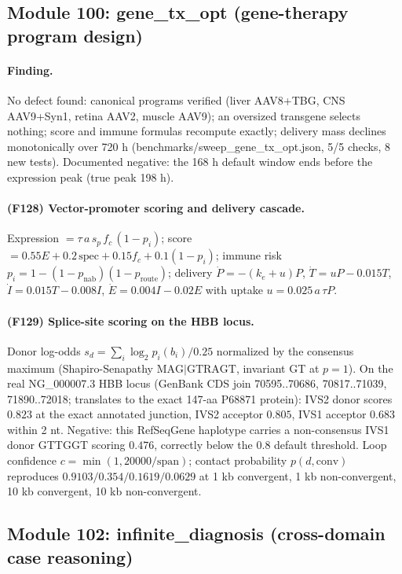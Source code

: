 \subsection{Module 100: gene\_tx\_opt (gene-therapy program design)}
\paragraph{Finding.} No defect found: canonical programs verified (liver AAV8+TBG, CNS AAV9+Syn1, retina AAV2, muscle AAV9); an oversized transgene selects nothing; score and immune formulas recompute exactly; delivery mass declines monotonically over 720 h (benchmarks/sweep\_gene\_tx\_opt.json, 5/5 checks, 8 new tests). Documented negative: the 168 h default window ends before the expression peak (true peak 198 h).
\paragraph{(F128) Vector-promoter scoring and delivery cascade.} Expression $=\tau\,a\,s_p\,f_c\,(1-p_i)$; score $=0.55E+0.2\,\mathrm{spec}+0.15f_c+0.1(1-p_i)$; immune risk $p_i=1-(1-p_{\mathrm{nab}})(1-p_{\mathrm{route}})$; delivery $\dot P=-(k_e+u)P$, $\dot T=uP-0.015T$, $\dot I=0.015T-0.008I$, $\dot E=0.004I-0.02E$ with uptake $u=0.025\,a\,\tau P$.
\paragraph{(F129) Splice-site scoring on the HBB locus.} Donor log-odds $s_d=\sum_i \log_2 p_i(b_i)/0.25$ normalized by the consensus maximum (Shapiro-Senapathy $\mathrm{MAG|GTRAGT}$, invariant GT at $p=1$). On the real NG\_000007.3 HBB locus (GenBank CDS join 70595..70686, 70817..71039, 71890..72018; translates to the exact 147-aa P68871 protein): IVS2 donor scores $0.823$ at the exact annotated junction, IVS2 acceptor $0.805$, IVS1 acceptor $0.683$ within 2 nt. Negative: this RefSeqGene haplotype carries a non-consensus IVS1 donor GTTGGT scoring $0.476$, correctly below the $0.8$ default threshold. Loop confidence $c=\min(1,20000/\mathrm{span})$; contact probability $p(d,\mathrm{conv})$ reproduces $0.9103/0.354/0.1619/0.0629$ at 1 kb convergent, 1 kb non-convergent, 10 kb convergent, 10 kb non-convergent.
\subsection{Module 102: infinite\_diagnosis (cross-domain case reasoning)}
